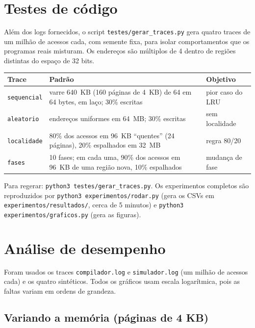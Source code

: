 \documentclass[11pt,a4paper]{article}
\begin{document}
\section{Testes de código}

Além dos logs fornecidos, o script \texttt{testes/gerar\_traces.py}
gera quatro traces de um milhão de acessos cada, com semente fixa, para
isolar comportamentos que os programas reais misturam. Os endereços são
múltiplos de 4 dentro de regiões distintas do espaço de 32 bits.

\begin{table}[H]
\centering\small
\begin{tabular}{@{}lp{9.3cm}l@{}}
\toprule
Trace & Padrão & Objetivo \\
\midrule
\texttt{sequencial} & varre 640~KB (160 páginas de 4~KB) de 64 em 64 bytes, em laço; 30\% escritas & pior caso do LRU \\
\texttt{aleatorio}  & endereços uniformes em 64~MB; 30\% escritas & sem localidade \\
\texttt{localidade} & 80\% dos acessos em 96~KB ``quentes'' (24 páginas), 20\% espalhados em 32~MB & regra 80/20 \\
\texttt{fases}      & 10 fases; em cada uma, 90\% dos acessos em 96~KB de uma região nova, 10\% espalhados & mudança de fase \\
\bottomrule
\end{tabular}
\end{table}

Para regerar: \texttt{python3 testes/gerar\_traces.py}. Os experimentos
completos são reproduzidos por \texttt{python3 experimentos/rodar.py}
(gera os CSVs em \texttt{experimentos/resultados/}, cerca de 5 minutos)
e \texttt{python3 experimentos/graficos.py} (gera as figuras).

\section{Análise de desempenho}

Foram usados os traces \texttt{compilador.log} e \texttt{simulador.log}
(um milhão de acessos cada) e os quatro sintéticos. Todos os gráficos
usam escala logarítmica, pois as faltas variam em ordens de grandeza.

\subsection{Variando a memória (páginas de 4 KB)}
\end{document}
